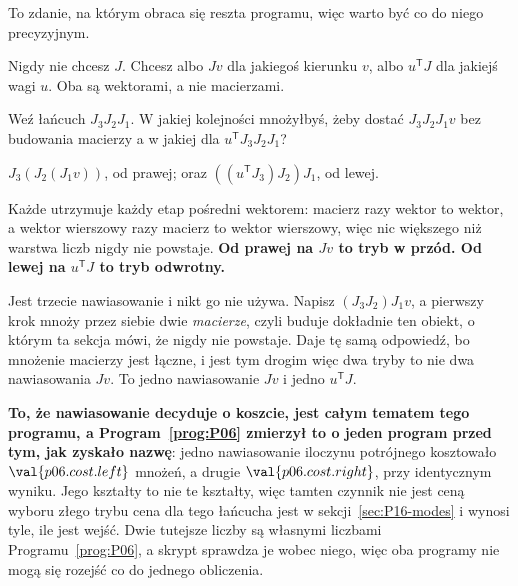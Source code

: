 \begin{fr}
To zdanie, na którym obraca się reszta programu, więc warto być co do niego
precyzyjnym.

Nigdy nie chcesz $J$. Chcesz albo $Jv$ dla jakiegoś kierunku $v$, albo
$u^{\mathsf{T}}J$ dla jakiejś wagi $u$. Oba są wektorami, a nie macierzami.

Weź łańcuch $J_3 J_2 J_1$. W jakiej kolejności mnożyłbyś, żeby dostać
$J_3 J_2 J_1 v$ bez budowania macierzy \dash{} a w jakiej dla
$u^{\mathsf{T}} J_3 J_2 J_1$?
\dotline
\nextframe
\end{fr}

\begin{fr}
\begin{ansblock}
$J_3(J_2(J_1 v))$, od prawej; oraz $((u^{\mathsf{T}}J_3)J_2)J_1$, od lewej.
\end{ansblock}

Każde utrzymuje każdy etap pośredni wektorem: macierz razy wektor to wektor, a
wektor wierszowy razy macierz to wektor wierszowy, więc nic większego niż
warstwa liczb nigdy nie powstaje. \textbf{Od prawej na $Jv$ to tryb w przód.
Od lewej na $u^{\mathsf{T}}J$ to tryb odwrotny.}

Jest trzecie nawiasowanie i nikt go nie używa. Napisz $(J_3 J_2) J_1 v$, a
pierwszy krok mnoży przez siebie dwie \emph{macierze}, czyli buduje dokładnie
ten obiekt, o którym ta sekcja mówi, że nigdy nie powstaje. Daje tę samą
odpowiedź, bo mnożenie macierzy jest łączne, i jest tym drogim \dash{} więc
dwa tryby to nie dwa nawiasowania $Jv$. To jedno nawiasowanie $Jv$ i jedno
$u^{\mathsf{T}}J$.

\textbf{To, że nawiasowanie decyduje o koszcie, jest całym tematem tego
programu, a Program~\ref{prog:P06} zmierzył to o jeden program przed tym, jak
zyskało nazwę}: jedno nawiasowanie iloczynu potrójnego kosztowało
$\val{p06.cost.left}$ mnożeń, a drugie $\val{p06.cost.right}$, przy
identycznym wyniku. Jego kształty to nie te kształty, więc tamten czynnik nie
jest ceną wyboru złego trybu \dash{} cena dla tego łańcucha jest w
sekcji~\ref{sec:P16-modes} i wynosi tyle, ile jest wejść. Dwie tutejsze liczby
są własnymi liczbami Programu~\ref{prog:P06}, a skrypt sprawdza je wobec
niego, więc oba programy nie mogą się rozejść co do jednego obliczenia.

\end{fr}

